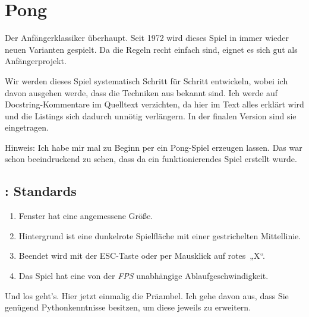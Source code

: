 \section{Pong}

Der Anfängerklassiker überhaupt. Seit 1972 wird dieses Spiel in immer wieder neuen Varianten gespielt. Da die Regeln recht einfach sind, eignet es sich gut als Anfängerprojekt. 

Wir werden dieses Spiel systematisch Schritt für Schritt entwickeln, wobei ich davon ausgehen werde, dass die Techniken aus  bekannt sind. Ich werde auf Docstring-Kommentare im Quelltext verzichten, da hier im Text alles erklärt wird und die Listings sich dadurch unnötig verlängern. In der finalen Version sind sie eingetragen.

Hinweis: Ich habe mir mal zu Beginn per  ein Pong-Spiel erzeugen lassen. Das war schon beeindruckend zu sehen, dass da ein funktionierendes Spiel erstellt wurde.

\subsection{: Standards}

\begin{enumerate}
    \item Fenster hat eine angemessene Größe.\label{req0201StandardGröße}
    \item Hintergrund ist eine dunkelrote Spielfläche mit einer gestrichelten Mittellinie.\label{req0201StandardHintergrund}
    \item Beendet wird mit der ESC-Taste oder per Mausklick auf rotes~„X“.\label{req0201StandardBeenden}
    \item Das Spiel hat eine von der \emph{FPS} unabhängige Ablaufgeschwindigkeit.\label{req0201StandardFps}
\end{enumerate}
\er

Und los geht's. Hier jetzt einmalig die Präambel. Ich gehe davon aus, dass Sie genügend Pythonkenntnisse besitzen, um diese jeweils zu erweitern.



